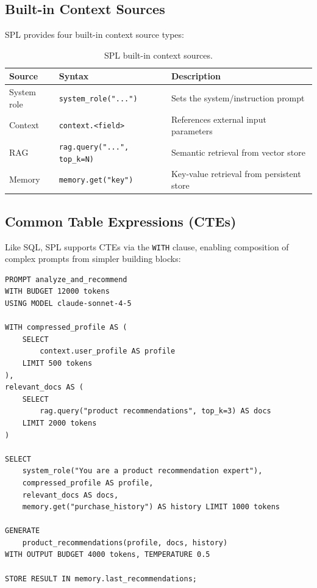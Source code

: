 \documentclass[11pt,a4paper]{article}
\begin{document}
\subsection{Built-in Context Sources}

SPL provides four built-in context source types:

\begin{table}[h]
\centering
\caption{SPL built-in context sources.}
\label{tab:sources}
\begin{tabular}{@{}llp{6cm}@{}}
\toprule
\textbf{Source} & \textbf{Syntax} & \textbf{Description} \\
\midrule
System role & \texttt{system\_role("...")} & Sets the system/instruction prompt \\
Context & \texttt{context.<field>} & References external input parameters \\
RAG & \texttt{rag.query("...", top\_k=N)} & Semantic retrieval from vector store \\
Memory & \texttt{memory.get("key")} & Key-value retrieval from persistent store \\
\bottomrule
\end{tabular}
\end{table}

\subsection{Common Table Expressions (CTEs)}

Like SQL, SPL supports CTEs via the \texttt{WITH} clause, enabling composition of complex prompts from simpler building blocks:

\begin{lstlisting}[language=SPL, caption={CTEs for composable prompt construction}]
PROMPT analyze_and_recommend
WITH BUDGET 12000 tokens
USING MODEL claude-sonnet-4-5

WITH compressed_profile AS (
    SELECT
        context.user_profile AS profile
    LIMIT 500 tokens
),
relevant_docs AS (
    SELECT
        rag.query("product recommendations", top_k=3) AS docs
    LIMIT 2000 tokens
)

SELECT
    system_role("You are a product recommendation expert"),
    compressed_profile AS profile,
    relevant_docs AS docs,
    memory.get("purchase_history") AS history LIMIT 1000 tokens

GENERATE
    product_recommendations(profile, docs, history)
WITH OUTPUT BUDGET 4000 tokens, TEMPERATURE 0.5

STORE RESULT IN memory.last_recommendations;
\end{lstlisting}
\end{document}
